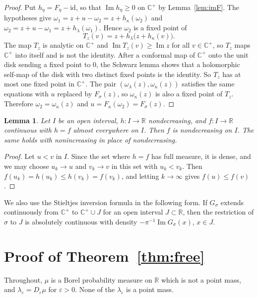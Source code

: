 \documentclass[11pt]{amsart}
\numberwithin{equation}{section}
\newtheorem{lemma}[theorem]{Lemma}
\theoremstyle{definition}
\theoremstyle{remark}
\newcommand{\R}{\mathbb R}
\newcommand{\Cp}{\mathbb C^{+}}
\renewcommand{\Im}{\operatorname{Im}}
\begin{document}
\begin{proof}
Put $h_\eta=F_\eta-\mathrm{id}$, so that $\Im h_\eta\ge0$ on $\Cp$ by Lemma~\ref{lem:imF}. The hypotheses give $\omega_1=z+u-\omega_2=z+h_\kappa(\omega_2)$ and $\omega_2=z+u-\omega_1=z+h_\lambda(\omega_1)$. Hence $\omega_2$ is a fixed point of
\[
T_z(v)=z+h_\lambda\bigl(z+h_\kappa(v)\bigr).
\]
The map $T_z$ is analytic on $\Cp$ and $\Im T_z(v)\ge\Im z$ for all $v\in\Cp$, so $T_z$ maps $\Cp$ into itself and is not the identity. After a conformal map of $\Cp$ onto the unit disk sending a fixed point to $0$, the Schwarz lemma shows that a holomorphic self-map of the disk with two distinct fixed points is the identity. So $T_z$ has at most one fixed point in $\Cp$. The pair $(\omega_\lambda(z),\omega_\kappa(z))$ satisfies the same equations with $u$ replaced by $F_\sigma(z)$, so $\omega_\kappa(z)$ is also a fixed point of $T_z$. Therefore $\omega_2=\omega_\kappa(z)$ and $u=F_\kappa(\omega_2)=F_\sigma(z)$.
\end{proof}

\begin{lemma}\label{lem:transfer}
Let $I$ be an open interval, $h\colon I\to\R$ nondecreasing, and $f\colon I\to\R$ continuous with $h=f$ almost everywhere on $I$. Then $f$ is nondecreasing on $I$. The same holds with nonincreasing in place of nondecreasing.
\end{lemma}

\begin{proof}
Let $u<v$ in $I$. Since the set where $h=f$ has full measure, it is dense, and we may choose $u_k\to u$ and $v_k\to v$ in this set with $u_k<v_k$. Then $f(u_k)=h(u_k)\le h(v_k)=f(v_k)$, and letting $k\to\infty$ gives $f(u)\le f(v)$.
\end{proof}

We also use the Stieltjes inversion formula in the following form. If $G_\sigma$ extends continuously from $\Cp$ to $\Cp\cup J$ for an open interval $J\subset\R$, then the restriction of $\sigma$ to $J$ is absolutely continuous with density $-\pi^{-1}\Im G_\sigma(x)$, $x\in J$.

\section{Proof of Theorem~\ref{thm:free}}
Throughout, $\mu$ is a Borel probability measure on $\R$ which is not a point mass, and $\lambda_\varepsilon=D_\varepsilon\mu$ for $\varepsilon>0$. None of the $\lambda_\varepsilon$ is a point mass.
\end{document}
